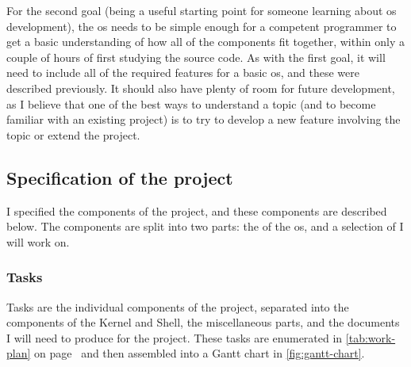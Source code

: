 \documentclass{article}
\begin{document}
For the second goal (being a useful starting point for someone learning about
\gls{os} development), the \gls{os} needs to be simple enough for a competent
programmer to get a basic understanding of how all of the components fit
together, within only a couple of hours of first studying the source code. As
with the first goal, it will need to include all of the required features for a
basic \gls{os}, and these were described previously. It should also have plenty
of room for future development, as I believe that one of the best ways to
understand a topic (and to become familiar with an existing project) is to try
to develop a new feature involving the topic or extend the project.


\subsection{Specification of the project}
I specified the components of the project, and these components are described
below. The components are split into two parts: the  of the
\gls{os}, and a selection of  I will work on.

\subsubsection{Tasks}
\label{sec:tasks}
Tasks are the individual components of the project, separated into the
components of the Kernel and Shell, the miscellaneous parts, and the documents
I will need to produce for the project. These tasks are enumerated in
\autoref{tab:work-plan} on page~\pageref*{tab:work-plan} and
then assembled into a Gantt chart in \autoref{fig:gantt-chart}.
\end{document}
